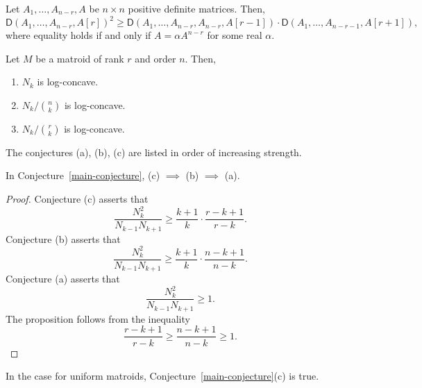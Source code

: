 \documentclass[12pt]{article}
\begin{document}
\begin{thm}
	Let $A_1, \ldots, A_{n-r}, A$ be $n \times n$ positive definite matrices. Then, 
	\[
		\mathsf{D}(A_1, \ldots, A_{n-r}, A[r])^2 \geq \mathsf{D} (A_1, \ldots, A_{n-r}, A_{n-r}, A[r-1]) \cdot \mathsf{D} (A_1, \ldots, A_{n-r-1}, A[r+1]), 
	\]
	where equality holds if and only if $A = \alpha A^{n-r}$ for some real $\alpha$. 
\end{thm}

\begin{conj} \label{main-conjecture}
	Let $M$ be a matroid of rank $r$ and order $n$. Then,  
	\begin{enumerate}[label = (\alph*)]
		\item $N_k$ is log-concave.
		\item $N_k /\binom{n}{k}$ is log-concave.
		\item $N_k / \binom{r}{k}$ is log-concave.
	\end{enumerate}
\end{conj}

The conjectures (a), (b), (c) are listed in order of increasing strength. 

\begin{prop}
	In Conjecture~\ref{main-conjecture}, (c) $\implies$ (b) $\implies$ (a). 
\end{prop}

\begin{proof}
	Conjecture (c) asserts that 
	\[
		\frac{N_k^2}{N_{k-1}N_{k+1}} \geq \frac{k+1}{k} \cdot \frac{r-k+1}{r-k}.
	\]
	Conjecture (b) asserts that
	\[
		\frac{N_k^2}{N_{k-1}N_{k+1}} \geq \frac{k+1}{k} \cdot \frac{n-k+1}{n-k}.
	\]
	Conjecture (a) asserts that 
	\[
		\frac{N_k^2}{N_{k-1}N_{k+1}} \geq 1. 
	\]
	The proposition follows from the inequality 
	\[
		\frac{r-k+1}{r-k} \geq \frac{n-k+1}{n-k} \geq 1.
	\]
\end{proof}

\begin{prop}
	In the case for uniform matroids, Conjecture~\ref{main-conjecture}(c) is true. 
\end{prop}
\end{document}
